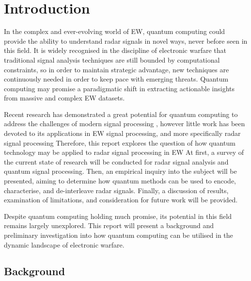 \section{Introduction}
\label{sec:introduction}

In the complex and ever-evolving world of \ac{EW}, quantum computing could provide the ability to understand radar signals in novel ways, never before seen in this field. 
It is widely recognised in the discipline of electronic warfare that traditional signal analysis techniques are still bounded by computational constraints, so in order to maintain strategic advantage, new techniques are continuously needed in order to keep pace with emerging threats. 
Quantum computing may promise a paradigmatic shift in extracting actionable insights from massive and complex \ac{EW} datasets. 

Recent research has demonstrated a great potential for quantum computing to address the challenges of modern signal processing
\cite{somma_quantum_2019, daskin_walk_2022},
however little work has been devoted to its applications in \ac{EW} signal processing, and more specifically radar signal processing 
Therefore, this report explores the question of how quantum technology may be applied
to radar signal processing in EW
At first, a survey of the current state of research will be conducted for radar signal analysis and quantum signal processing. 
Then, an empirical inquiry into the subject will be presented, aiming to determine 
how quantum methods can be used to encode, characterise, and de-interleave radar signals.
Finally, a discussion of results, examination of limitations, and consideration for future work will be provided. 
 
Despite quantum computing holding much promise, its potential in this field remains largely unexplored. This report will present a background and preliminary investigation into how quantum computing can be utilised in the dynamic landscape of electronic warfare. 

\subsection{Background}~\label{subsec:background}

